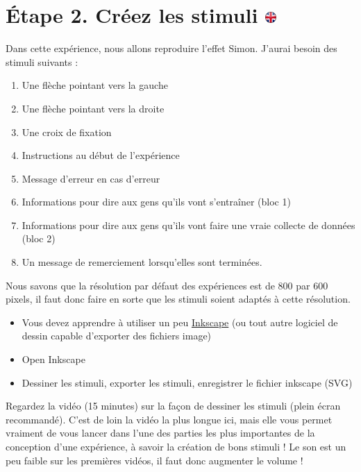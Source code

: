 \documentclass[
]{book}
\providecommand{\tightlist}{%
  \setlength{\itemsep}{0pt}\setlength{\parskip}{0pt}}
\begin{document}
\hypertarget{uxe9tape-2.-cruxe9ez-les-stimuli}{%
\section[Étape 2. Créez les stimuli ]{\texorpdfstring{Étape 2. Créez les
stimuli
\href{https://www.psytoolkit.org/lessons/project.html\#_step_2_create_new_experiment}{\protect\includegraphics{img/ukflag.png}}}{Étape 2. Créez les stimuli }}\label{uxe9tape-2.-cruxe9ez-les-stimuli}}

Dans cette expérience, nous allons reproduire l'effet Simon. J'aurai
besoin des stimuli suivants :

\begin{enumerate}
\def\labelenumi{\arabic{enumi}.}
\tightlist
\item
  Une flèche pointant vers la gauche
\item
  Une flèche pointant vers la droite
\item
  Une croix de fixation
\item
  Instructions au début de l'expérience
\item
  Message d'erreur en cas d'erreur
\item
  Informations pour dire aux gens qu'ils vont s'entraîner (bloc 1)
\item
  Informations pour dire aux gens qu'ils vont faire une vraie collecte
  de données (bloc 2)
\item
  Un message de remerciement lorsqu'elles sont terminées.
\end{enumerate}

Nous savons que la résolution par défaut des expériences est de 800 par
600 pixels, il faut donc faire en sorte que les stimuli soient adaptés à
cette résolution.

\begin{itemize}
\tightlist
\item
  Vous devez apprendre à utiliser un peu
  \href{https://www.psytoolkit.org/lessons/inkscape.html}{Inkscape} (ou
  tout autre logiciel de dessin capable d'exporter des fichiers image)
\item
  Open Inkscape
\item
  Dessiner les stimuli, exporter les stimuli, enregistrer le fichier
  inkscape (SVG)
\end{itemize}

Regardez la vidéo (15 minutes) sur la façon de dessiner les stimuli
(plein écran recommandé). C'est de loin la vidéo la plus longue ici,
mais elle vous permet vraiment de vous lancer dans l'une des parties les
plus importantes de la conception d'une expérience, à savoir la création
de bons stimuli ! Le son est un peu faible sur les premières vidéos, il
faut donc augmenter le volume !
\end{document}
